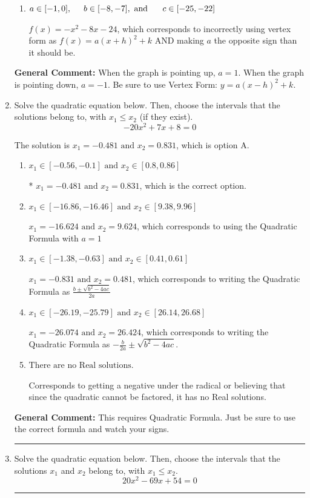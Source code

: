 \documentclass{extbook}[14pt]
\newcommand{\litem}[1]{\item #1

\rule{\textwidth}{0.4pt}}
\begin{document}
\begin{enumerate}
{\begin{enumerate}[label=\Alph*.]
* $f(x)=x^{2} -8 x + 8$, which is the correct option.
\item \( a \in [-1, 0], \hspace*{5mm} b \in [-8, -7], \text{ and } \hspace*{5mm} c \in [-25, -22] \)

$f(x)=-x^{2} -8 x -24$, which corresponds to incorrectly using vertex form as $f(x) = a(x+h)^2+k$ AND making $a$ the opposite sign than it should be.
\end{enumerate}

\textbf{General Comment:} When the graph is pointing up, $a=1$. When the graph is pointing down, $a=-1$. Be sure to use Vertex Form: $y = a(x-h)^2+k$.
}
\litem{
Solve the quadratic equation below. Then, choose the intervals that the solutions belong to, with $x_1 \leq x_2$ (if they exist).
\[ -20x^{2} +7 x + 8 = 0 \]

The solution is \( x_1 = -0.481 \text{ and } x_2 = 0.831 \), which is option A.\begin{enumerate}[label=\Alph*.]
\item \( x_1 \in [-0.56, -0.1] \text{ and } x_2 \in [0.8, 0.86] \)

* $x_1 = -0.481 \text{ and } x_2 = 0.831$, which is the correct option.
\item \( x_1 \in [-16.86, -16.46] \text{ and } x_2 \in [9.38, 9.96] \)

 $x_1 = -16.624 \text{ and } x_2 = 9.624$, which corresponds to using the Quadratic Formula with $a=1$
\item \( x_1 \in [-1.38, -0.63] \text{ and } x_2 \in [0.41, 0.61] \)

 $x_1 = -0.831 \text{ and } x_2 = 0.481$, which corresponds to writing the Quadratic Formula as $\frac{b \pm \sqrt{b^2 - 4ac}}{2a}$
\item \( x_1 \in [-26.19, -25.79] \text{ and } x_2 \in [26.14, 26.68] \)

 $x_1 = -26.074 \text{ and } x_2 = 26.424$, which corresponds to writing the Quadratic Formula as $-\frac{b}{2a} \pm \sqrt{b^2 - 4ac}$.
\item \( \text{There are no Real solutions.} \)

Corresponds to getting a negative under the radical or believing that since the quadratic cannot be factored, it has no Real solutions.
\end{enumerate}

\textbf{General Comment:} This requires Quadratic Formula. Just be sure to use the correct formula and watch your signs.
}
\litem{
Solve the quadratic equation below. Then, choose the intervals that the solutions $x_1$ and $x_2$ belong to, with $x_1 \leq x_2$.
\[ 20x^{2} -69 x + 54 = 0 \]

}
\end{enumerate}
\end{document}
